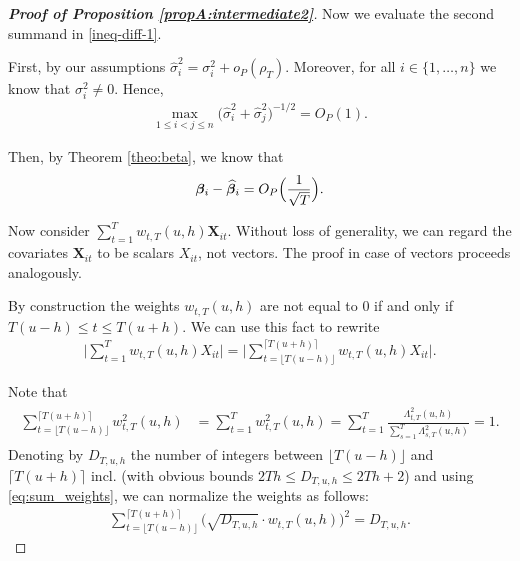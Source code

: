 \begin{proof}[\textnormal{\textbf{Proof of Proposition \ref{propA:intermediate2}}}]
Now we evaluate the second summand in \eqref{ineq-diff-1}.

First, by our assumptions $\widehat{\sigma}_i^2 = \sigma_i^2 + o_P(\rho_T)$. Moreover, for all $i \in \{1, \ldots, n\}$ we know that $\sigma_i^2 \neq 0$. Hence, 
\begin{align}\label{ineq-diff-6}
\max_{1\le i < j \le n}\big(\widehat{\sigma}_i^2+ \widehat{\sigma}_j^2 \big)^{-1/2}  = O_P(1).
\end{align}

Then, by Theorem \ref{theo:beta}, we know that 
\begin{align}\label{ineq-diff-7}
\bm{\beta}_i - \widehat{\bm{\beta}}_i = O_P\Big(\frac{1}{\sqrt{T}}\Big).
\end{align}

Now consider $\sum_{t=1}^T w_{t,T}(u,h) \mathbf{X}_{it}$. Without loss of generality, we can regard the covariates $\mathbf{X}_{it}$ to be scalars $X_{it}$, not vectors. The proof in case of vectors proceeds analogously.

 
By construction the weights $w_{t, T}(u, h)$ are not equal to $0$ if and only if \linebreak $T(u-h) \le t \le T(u+h)$. We can use this fact to rewrite
\begin{align*}
\Big| \sum_{t=1}^T w_{t,T}(u,h) X_{it}   \Big|  = \bigg| \sum_{t=\lfloor T(u-h) \rfloor}^{\lceil T(u+h) \rceil} w_{t,T}(u,h)X_{it}   \bigg|.
\end{align*}

Note that
\begin{align}\label{eq:sum_weights}
\begin{split}
\sum_{t=\lfloor T(u-h) \rfloor}^{\lceil T(u+h) \rceil} w^2_{t,T}(u,h) &= \sum_{t=1}^T w^2_{t,T}(u,h) = \sum_{t=1}^T\frac{\Lambda^2_{t,T}(u,h)}{\sum\nolimits_{s=1}^T\Lambda^2_{s,T}(u,h) } = 1.
\end{split}
\end{align}
Denoting by $D_{T, u, h}$ the number of integers between $\lfloor T(u-h) \rfloor$ and $\lceil T(u+h) \rceil$ incl. (with obvious bounds $2Th \leq D_{T, u, h} \leq 2Th + 2$) and using \eqref{eq:sum_weights}, we can normalize the weights as follows:
\begin{align*}
\sum_{t=\lfloor T(u-h) \rfloor}^{\lceil T(u+h) \rceil} \big(\sqrt{D_{T, u, h}}\cdot w_{t,T}(u,h)\big)^2 = D_{T, u, h}.
\end{align*}


\end{proof}
